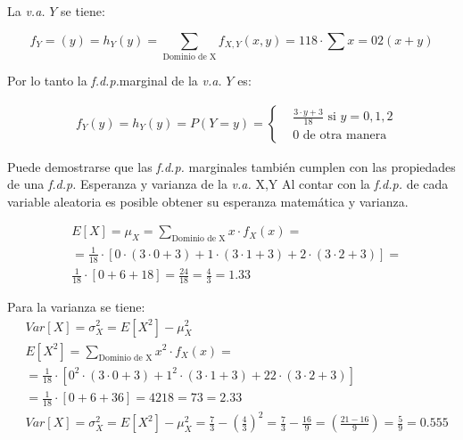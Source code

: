 La \textit{v.a.} $Y$ se tiene:

\begin{equation*}
    f_Y=\left(y\right)=h_Y \left(y\right) = \sum_{\text{Dominio de X}} f_{X,Y}  \left(x,y\right) = 1 18 \cdot \sum x=0 2 \left(x+y\right)
\end{equation*}

Por lo tanto la \textit{f.d.p.}marginal de la \textit{v.a.} $Y$ es:

\begin{align*}
     & f_Y \left(y\right)=h_Y \left(y\right)=P\left( Y= y\right) =\begin{cases}
         & \frac{3\cdot  y+3}{18}\text{ si } y=0,1,2 \\
         & 0\text{ de otra manera}\end{cases}
\end{align*}


Puede demostrarse que las \textit{f.d.p.} marginales también cumplen con las propiedades de una \textit{f.d.p.}  Esperanza y varianza de la \textit{v.a.} X,Y Al contar con la \textit{f.d.p.} de cada variable aleatoria es posible obtener su esperanza matemática y varianza.

\begin{example}
    \begin{align*}
        &E\left[X\right]=\mu_X= \sum_{\text{Dominio de X}} x\cdot f_X \left( x \right)=\\
        &=\frac{1}{18} \cdot \left[ 0\cdot \left( 3\cdot 0+3\right) +1\cdot \left( 3\cdot 1+3\right) +2\cdot \left( 3\cdot 2+3\right) \right]=\\
        &\frac{1}{18}\cdot \left[ 0+6+18 \right]= \frac{24}{18} =\frac{4}{3} =1.33
    \end{align*}

    Para la varianza se tiene:
\begin{align*}
        & Var\left[ X \right]=\sigma_X^2 =E\left[X^2\right]-\mu_X^2                                                                                                                                                                                                          \\
        & E\left[X^2\right]=\sum_{\text{Dominio de X}}x^2\cdot f_X\left( x\right)=\\
        &=\frac{1}{18}\cdot \left[0^2\cdot \left( 3\cdot 0+3\right) +1^2\cdot \left( 3\cdot 1+3\right) +22\cdot \left( 3\cdot 2+3\right) \right]\\
        &=\frac{1}{18}\cdot \left[ 0+6+36\right]=4218=73=2.33 \\
        & Var\left[X\right]=\sigma_X^2 =E\left[X^2\right]-\mu_X^2 =\frac{7}{3}-\left(\frac{4}{3}\right)^2=\frac{7}{3}-\frac{16}{9}=\left(\frac{21-16}{9}\right)=\frac{5}{9}=0.555
   \end{align*}
\end{example}

